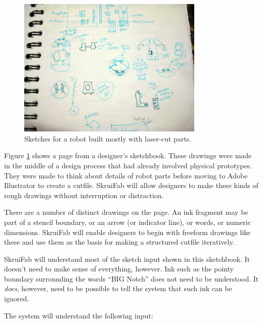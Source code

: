 \documentclass[12pt]{article}
\begin{document}
\begin{figure}[h] %
   \centering
   \includegraphics[width=3.5in]{img/memote-1-small.jpg} 
   \caption{Sketches for a robot built mostly with laser-cut parts.}
   \label{fig:memote-sketches}
\end{figure}

Figure \ref{fig:memote-sketches} shows a page from a designer's
sketchbook. These drawings were made in the middle of a design process
that had already involved physical prototypes. They were made to think
about details of robot parts before moving to Adobe Illustrator to
create a cutfile. SkruiFab will allow designers to make these kinds of
rough drawings without interruption or distraction.

There are a number of distinct drawings on the page. An ink fragment
may be part of a stencil boundary, or an arrow (or indicator line), or
words, or numeric dimensions. SkruiFab will enable designers to begin
with freeform drawings like these and use them as the basis for making
a structured cutfile iteratively.

SkruiFab will understand most of the sketch input shown in this
sketchbook. It doesn't need to make sense of everything, however. Ink
such as the pointy boundary surrounding the words ``BIG Notch'' does
not need to be understood. It \textit{does}, however, need to be
possible to tell the system that such ink can be ignored.

The system will understand the following input:
\end{document}
